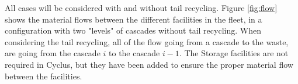 \documentclass{anstrans}
\begin{document}
All cases will be considered with and without tail recycling. Figure
\ref{fig:flow} shows the material flows between the different facilities in the
fleet, in a configuration with two "levels" of cascades without tail
recycling. When considering the tail recycling, all of the flow going from a
cascade to the waste, are going from the cascade $i$ to the cascade $i-1$.  The
Storage facilities are not required in Cyclus, but they have been added to ensure the proper
material flow between the facilities.


\begin{figure}[ht] %
  \centering

\end{figure}
\end{document}
